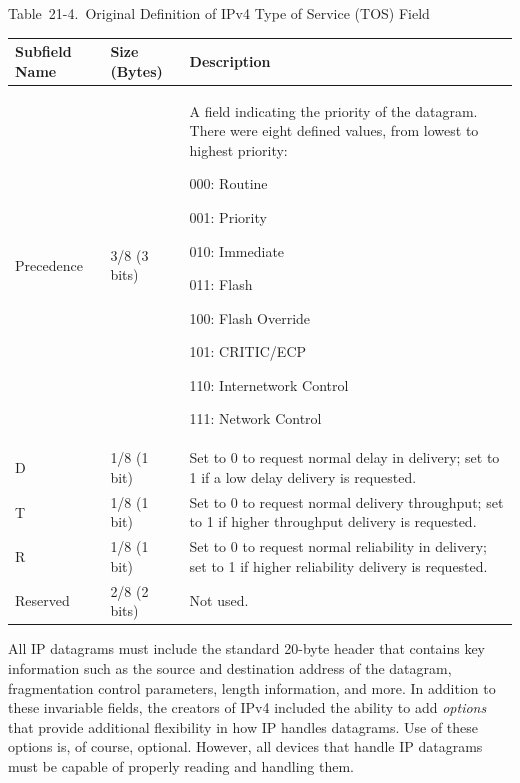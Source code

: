 \documentclass[b5paper,11pt]{memoir}
\begin{document}
Table~21-4.~Original Definition of IPv4 Type of Service (TOS) Field

\begin{longtable}[]{@{}lll@{}}
\toprule
Subfield Name & Size (Bytes) & Description\tabularnewline
\midrule
\endhead
\begin{minipage}[t]{0.30\columnwidth}\raggedright
Precedence\strut
\end{minipage} & \begin{minipage}[t]{0.30\columnwidth}\raggedright
3/8 (3 bits)\strut
\end{minipage} & \begin{minipage}[t]{0.30\columnwidth}\raggedright
A field indicating the priority of the datagram. There were eight
defined values, from lowest to highest priority:

000: Routine

001: Priority

010: Immediate

011: Flash

100: Flash Override

101: CRITIC/ECP

110: Internetwork Control

111: Network Control\strut
\end{minipage}\tabularnewline
D & 1/8 (1 bit) & Set to 0 to request normal delay in delivery; set to 1
if a low delay delivery is requested.\tabularnewline
T & 1/8 (1 bit) & Set to 0 to request normal delivery throughput; set to
1 if higher throughput delivery is requested.\tabularnewline
R & 1/8 (1 bit) & Set to 0 to request normal reliability in delivery;
set to 1 if higher reliability delivery is requested.\tabularnewline
Reserved & 2/8 (2 bits) & Not used.\tabularnewline
\bottomrule
\end{longtable}

\protect\hypertarget{ch21s03.html}{}{}

\protect\hypertarget{ch21s03.htmlux5cux23idx-CHP-21-0788}{}{}\protect\hypertarget{ch21s03.htmlux5cux23idx-CHP-21-0789}{}{}All
IP datagrams must include the standard 20-byte header that contains key
information such as the source and destination address of the datagram,
fragmentation control parameters, length information, and more. In
addition to these invariable fields, the creators of IPv4 included the
ability to add {\emph{options}} that provide additional flexibility in
how IP handles datagrams. Use of these options is, of course, optional.
However, all devices that handle IP datagrams must be capable of
properly reading and handling them.
\end{document}
